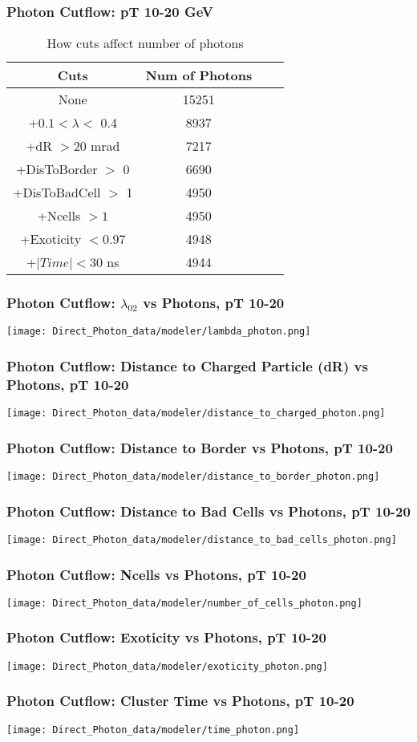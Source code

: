 \documentclass{beamer}
\begin{document}
\frame
{
    \frametitle{Photon Cutflow: pT 10-20 GeV}
     \begin{table} 
     \caption{How cuts affect number of photons} 
     \centering 
     \begin{tabular}{c c c c} 
     \hline\hline 
    Cuts & Num of Photons\\ [0.5ex] 
    \hline
    None & 15251\\
    +$0.1 < \lambda <$ 0.4 & 8937\\
    +dR $> 20$ mrad & 7217\\
    +DisToBorder $>$ 0 & 6690\\
    +DisToBadCell $>$ 1 & 4950\\
    +Ncells $> 1$ & 4950\\
    +Exoticity $< 0.97$ & 4948\\
    +$|Time| < 30$ ns & 4944\\
    [1ex] 
    \hline 
    \end{tabular} 
    \label{table:nonlin} 
    \end{table} 
}

\frame
{
	 \frametitle{Photon Cutflow: $\lambda_{02}$ vs Photons, pT 10-20}
	 \texttt{[image: Direct\_Photon\_data/modeler/lambda\_photon.png]}
}

\frame
{
      \frametitle{Photon Cutflow: Distance to Charged Particle (dR) vs Photons, pT 10-20}
      \texttt{[image: Direct\_Photon\_data/modeler/distance\_to\_charged\_photon.png]}
}

\frame
{
      \frametitle{Photon Cutflow: Distance to Border vs Photons, pT 10-20}
      \texttt{[image: Direct\_Photon\_data/modeler/distance\_to\_border\_photon.png]}
}

\frame
{
      \frametitle{Photon Cutflow: Distance to Bad Cells vs Photons, pT 10-20}
      \texttt{[image: Direct\_Photon\_data/modeler/distance\_to\_bad\_cells\_photon.png]}
}

\frame
{
      \frametitle{Photon Cutflow: Ncells vs Photons, pT 10-20}
      \texttt{[image: Direct\_Photon\_data/modeler/number\_of\_cells\_photon.png]}
}

\frame
{
      \frametitle{Photon Cutflow: Exoticity vs Photons, pT 10-20}
      \texttt{[image: Direct\_Photon\_data/modeler/exoticity\_photon.png]}
}

\frame
{
      \frametitle{Photon Cutflow: Cluster Time vs Photons, pT 10-20}
      \texttt{[image: Direct\_Photon\_data/modeler/time\_photon.png]}
}
\end{document}
